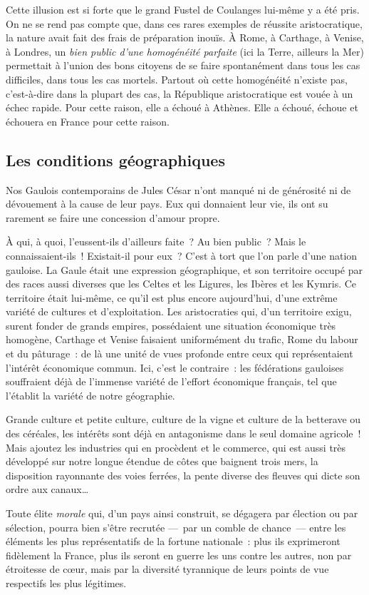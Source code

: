 \documentclass[french,twoside]{book} %
\newcommand{\astermono}{\medskip\centerline{\color{rubric}\large\selectfont{\syms ✻}}\medskip\par}%
\begin{document}
\noindent Cette illusion est si forte que le grand Fustel de Coulanges lui-même y a été pris. On ne se rend pas compte que, dans ces rares exemples de réussite aristocratique, la nature avait fait des frais de préparation inouïs. À Rome, à Carthage, à Venise, à Londres, un \emph{bien public d’une homogénéité parfaite} (ici la Terre, ailleurs la Mer) permettait à l’union des bons citoyens de se faire spontanément dans tous les cas difficiles, dans tous les cas mortels. Partout où cette homogénéité n’existe pas, c’est-à-dire dans la plupart des cas, la République aristocratique est vouée à un échec rapide. Pour cette raison, elle a échoué à Athènes. Elle a échoué, échoue et échouera en France pour cette raison.
\subsection[Les conditions géographiques]{Les conditions géographiques}
\noindent Nos Gaulois contemporains de Jules César n’ont manqué ni de générosité ni de dévouement à la cause de leur pays. Eux qui donnaient leur vie, ils ont su rarement se faire une concession d’amour propre.\par
À qui, à quoi, l’eussent-ils d’ailleurs faite ? Au bien public ? Mais le connaissaient-ils ! Existait-il pour eux ? C’est à tort que l’on parle d’une nation gauloise. La Gaule était une expression géographique, et son territoire occupé par des races aussi diverses que les Celtes et les Ligures, les Ibères et les Kymris. Ce territoire était lui-même, ce qu’il est plus encore aujourd’hui, d’une extrême variété de cultures et d’exploitation. Les aristocraties qui, d’un territoire exigu, surent fonder de grands empires, possédaient une situation économique très homogène, Carthage et Venise faisaient uniformément du trafic, Rome du labour et du pâturage : de là une unité de vues profonde entre ceux qui représentaient l’intérêt économique commun. Ici, c’est le contraire : les fédérations gauloises souffraient déjà de l’immense variété de l’effort économique français, tel que l’établit la variété de notre géographie.\par

\astermono

\noindent Grande culture et petite culture, culture de la vigne et culture de la betterave ou des céréales, les intérêts sont déjà en antagonisme dans le seul domaine agricole ! Mais ajoutez les industries qui en procèdent et le commerce, qui est aussi très développé sur notre longue étendue de côtes que baignent trois mers, la disposition rayonnante des voies ferrées, la pente diverse des fleuves qui dicte son ordre aux canaux…\par
Toute élite \emph{morale} qui, d’un pays ainsi construit, se dégagera par élection ou par sélection, pourra bien s’être recrutée — par un comble de chance — entre les éléments les plus représentatifs de la fortune nationale : plus ils exprimeront fidèlement la France, plus ils seront en guerre les uns contre les autres, non par étroitesse de cœur, mais par la diversité tyrannique de leurs points de vue respectifs les plus légitimes.\par
\end{document}
